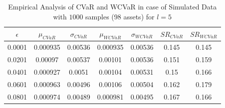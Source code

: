 \begin{table}[!h]
    \centering
    \captionsetup{justification=centering}

   \begin{tabular}{||c|c|c|c|c|c|c||}
   \hline
  
$\epsilon$ & $\mu_{CVaR}$ & $\sigma_{CVaR}$ & $\mu_{WCVaR}$ & $\sigma_{WCVaR}$ & $SR_{CVaR}$ & $SR_{WCVaR}$\\
  
  \hline
0.0001 & 0.000935 & 0.00536 & 0.000935 & 0.00536 & 0.145 & 0.145 \\
0.0201 & 0.00097 & 0.00537 & 0.00101 & 0.00536 & 0.151 & 0.159 \\
0.0401 & 0.000927 & 0.0051 & 0.00104 & 0.00531 & 0.15 & 0.166 \\
0.0601 & 0.000963 & 0.00496 & 0.00106 & 0.00504 & 0.162 & 0.179 \\
0.0801 & 0.000974 & 0.00489 & 0.000981 & 0.00495 & 0.167 & 0.166 \\
  \hline
\end{tabular}
    \caption{Empirical Analysis of CVaR and WCVaR in case of Simulated Data with $1000$ samples (98 assets) for $l=5$}
    \label{tab:6.6}
\end{table}








